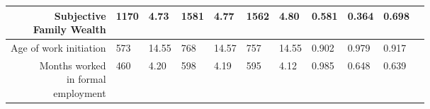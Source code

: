 \begin{longtable}{|r|l|l|l|l|l|l|l|l|l|l}
	 \makecell{Subjective\\Family Wealth}                                           & 1170                                                               &  4.73                                                              & 1581                                                               &  4.77                                                              & 1562                                                               &  4.80                                                              & 0.581                                                              & 0.364                                                              & 0.698                                                             \\

\hline

	 Age of work initiation                                             &  573                                                               & 14.55                                                              &  768                                                               & 14.57                                                              &  757                                                               & 14.55                                                              & 0.902                                                              & 0.979                                                              & 0.917                                                             \\

\hline

	 \makecell{Months worked \\in formal \\employment}                                 &  460                                                               &  4.20                                                              &  598                                                               &  4.19                                                              &  595                                                               &  4.12                                                              & 0.985                                                              & 0.648                                                              & 0.639                                                             \\

\hline


\end{longtable}
